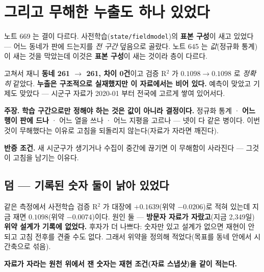 \documentclass[10pt,a4paper]{article}
\newcommand{\claim}[2]{\begin{claimbox}\textbf{주장.} #1\par\smallskip
  \textcolor{gray!70}{\textbf{반증 조건.} #2}\end{claimbox}}
\begin{document}
\section{그리고 무해한 누출도 하나 있었다}

노트 669 는 결이 다르다. 사전학습(\verb|state/fieldmodel|)의 \textbf{표본 구성}이
새고 있었다 --- 어느 동네가 판에 드는지를 \emph{전 구간} 덮음으로 골랐다. 노트 645 는
\emph{값}(정규화 통계)이 새는 것을 막았는데 이것은 \textbf{표본 구성}이 새는 것이라
층이 다르다.

고쳐서 재니 \textbf{동네 261 $\to$ 261, 차이 0건}이고 검증 R$^2$ 가
$0.1098 \to 0.1098$ 로 \emph{정확히} 같았다. \textbf{누출은 구조적으로 실재했지만 이
자료에서는 비어 있다.} 예측이 맞았고 기제도 맞았다 --- 시군구 자료가 2020-01 부터
전국에 고르게 쌓여 있어서다.

\claim{\textbf{학습 구간으로만 정해야 하는 것은 값이 아니라 결정이다.} 정규화 통계 ·
\textbf{어느 행이 판에 드나} · 어느 열을 쓰나 · 어느 지평을 고르나 --- 넷이 다 같은
병이다. 이번 것이 무해했다는 이유로 고침을 되돌리지 않는다(자료가 자라면 깨진다).}
{새 시군구가 생기거나 수집이 중간에 끊기면 이 무해함이 사라진다 --- 그것이 고침을
남기는 이유다.}

\subsection*{덤 --- 기록된 숫자 둘이 낡아 있었다}

같은 측정에서 사전학습 검증 R$^2$ 가 대장에 \textbf{$+0.1639$}(위약 $-0.0206$)로
적혀 있는데 지금 재면 $0.1098$(위약 $-0.0074$)이다. 원인 둘 --- \textbf{방문자 자료가
자랐고}(지금 2{,}349일) \textbf{위약 설계가 기록에 없었다.} 후자가 더 나쁘다: 숫자만
있고 설계가 없으면 재현이 안 되고 고침 전후를 견줄 수도 없다. 그래서 위약을 정의해
적었다(목표를 동네 안에서 시간축으로 섞음).

\textbf{자료가 자라는 원천 위에서 잰 숫자는 재현 조건(자료 스냅샷)을 같이 적는다.}
\end{document}
